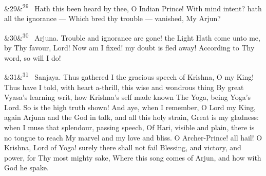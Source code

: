 \documentclass[12pt]{article}
\newcommand{\para}[1][]{\par\noindent\ifx&#1&\else\textsuperscript{\footnotesize #1}~\fi}
\begin{document}
\para[29] Hath this been heard by thee, O Indian Prince! With mind intent? hath all the ignorance --- Which bred thy trouble --- vanished, My Arjun?

\para[30] Arjuna. Trouble and ignorance are gone! the Light Hath come unto me, by Thy favour, Lord! Now am I fixed! my doubt is fled away! According to Thy word, so will I do!

\para[31] Sanjaya. Thus gathered I the gracious speech of Krishna, O my King! Thus have I told, with heart a-thrill, this wise and wondrous thing By great Vyasa's learning writ, how Krishna's self made known The Yoga, being Yoga's Lord. So is the high truth shown! And aye, when I remember, O Lord my King, again Arjuna and the God in talk, and all this holy strain, Great is my gladness: when I muse that splendour, passing speech, Of Hari, visible and plain, there is no tongue to reach My marvel and my love and bliss. O Archer-Prince! all hail! O Krishna, Lord of Yoga! surely there shall not fail Blessing, and victory, and power, for Thy most mighty sake, Where this song comes of Arjun, and how with God he spake.
\end{document}
